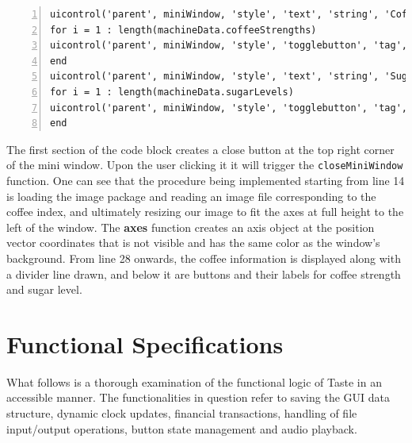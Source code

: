\documentclass[a4paper, 11pt]{article}
\begin{document}
\begin{lstlisting}[style=Matlab-editor, numbers = left, frame = single]
% Add buttons for coffee strength and sugar level
uicontrol('parent', miniWindow, 'style', 'text', 'string', 'Coffee Strength', 'units', 'normalized', 'position', [0.35 0.8 0.3 0.05], 'backgroundcolor', backgroundColor, 'foregroundcolor', 'black', 'fontsize', 14, 'fontname', 'Calibri');
for i = 1 : length(machineData.coffeeStrengths)
uicontrol('parent', miniWindow, 'style', 'togglebutton', 'tag', 'coffeeStrength', 'string', machineData.coffeeStrengths{i}, 'units', 'normalized', 'position', [0.35+(i-1)*0.1 0.7 0.09 0.09], 'backgroundcolor', 'white', 'foregroundcolor', '#FF5F1F', 'fontsize', 10, 'fontname', 'Calibri', 'callback', {@updateButton}, 'fontweight', 'bold');
end
uicontrol('parent', miniWindow, 'style', 'text', 'string', 'Sugar Level', 'units', 'normalized', 'position', [0.35 0.6 0.3 0.08], 'backgroundcolor', backgroundColor, 'foregroundcolor', 'black', 'fontsize', 14, 'fontname', 'Calibri');
for i = 1 : length(machineData.sugarLevels)
uicontrol('parent', miniWindow, 'style', 'togglebutton', 'tag', 'sugarLevel', 'string', machineData.sugarLevels{i}, 'units', 'normalized', 'position', [0.35+(i-1)*0.1 0.5 0.09 0.1], 'backgroundcolor', 'white', 'foregroundcolor', '#FF5F1F', 'fontsize', 10, 'fontname', 'Calibri', 'callback', {@updateButton}, 'fontweight', 'bold');
end
\end{lstlisting}
\vspace{5mm}

\noindent The first section of the code block creates a close button at the top right corner of the mini window. Upon the user clicking it it will trigger the \texttt{closeMiniWindow} function. One can see that the procedure being implemented starting from line 14 is loading the image package and reading an image file corresponding to the coffee index, and ultimately resizing our image to fit the axes at full height to the left of the window. The \textbf{axes} function creates an axis object at the position vector coordinates that is not visible and has the same color as the window's background. From line 28 onwards, the coffee information is displayed along with a divider line drawn, and below it are buttons and their labels for coffee strength and sugar level. 
\vspace{5mm}

\section{Functional Specifications}
\noindent What follows is a thorough examination of the functional logic of Taste in an accessible manner. The functionalities in question refer to saving the GUI data structure, dynamic clock updates, financial transactions, handling of file input/output operations, button state management and audio playback.
\end{document}
